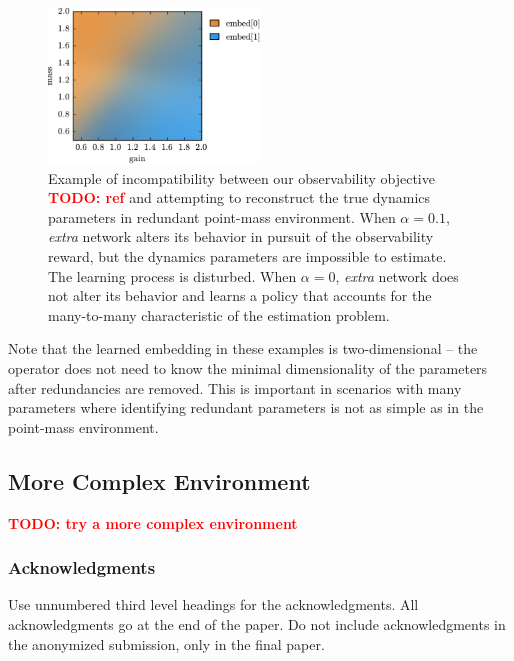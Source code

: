 \documentclass{article}
\newcommand{\TODO}[1]{\textcolor{red}{\textbf{TODO: #1}}}
\newcommand{\extra}{\emph{extra}}
\begin{document}
\begin{figure}
\centering
\includegraphics[width=0.5\textwidth]{embed_colors.pdf}
\caption{
Example of incompatibility between our observability objective \TODO{ref}
and attempting to reconstruct the true dynamics parameters
in redundant point-mass environment.
When $\alpha = 0.1$, \extra{} network alters its behavior in pursuit of the observability reward, but the dynamics parameters are impossible to estimate.
The learning process is disturbed.
When $\alpha = 0$, \extra{} network does not alter its behavior
and learns a policy that accounts for the many-to-many characteristic of the estimation problem.
}
\label{fig:redundant_fail}
\end{figure}


Note that the learned embedding in these examples is two-dimensional -- 
the operator does not need to know the minimal dimensionality of the parameters after redundancies are removed.
This is important in scenarios with many parameters where identifying redundant parameters 
is not as simple as in the point-mass environment.

\subsection{More Complex Environment}
\TODO{try a more complex environment}


\subsubsection*{Acknowledgments}

Use unnumbered third level headings for the acknowledgments. All
acknowledgments go at the end of the paper. Do not include
acknowledgments in the anonymized submission, only in the final paper.

\small

{}

\end{document}
